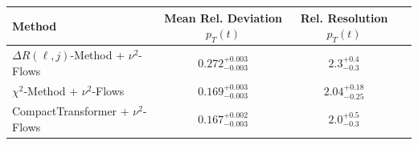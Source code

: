     \begin{tabular}{lccc}
        \toprule
        Method & Mean Rel. Deviation $p_{T}(t)$ & Rel. Resolution $p_{T}(t)$ \\
        \midrule
        $\Delta R(\ell,j)$-Method + $\nu^2$-Flows & $0.272^{+0.003}_{-0.003}$ & $2.3^{+0.4}_{-0.3}$ \\
        $\chi^2$-Method + $\nu^2$-Flows & $0.169^{+0.003}_{-0.003}$ & $2.04^{+0.18}_{-0.25}$ \\
        CompactTransformer + $\nu^2$-Flows & $0.167^{+0.002}_{-0.003}$ & $2.0^{+0.5}_{-0.3}$ \\
        \bottomrule
    \end{tabular}